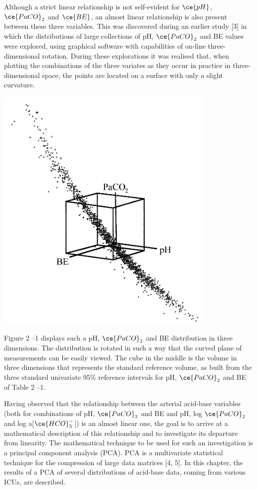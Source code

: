 \documentclass[
  12pt,
  a4paperpaper,
]{report}
\begin{document}
Although a strict linear relationship is not self-evident for
\(\ce{pH}\), \(\ce{PaCO}_{2}\) and \(\ce{BE}\), an almost linear
relationship is also present between these three variables. This was
discovered during an earlier study {[}3{]} in which the distributions of
large collections of pH, \(\ce{PaCO}_{2}\) and BE values were explored,
using graphical software with capabilities of on-line three-dimensional
rotation. During these explorations it was realised that, when plotting
the combinations of the three variates as they occur in practice in
three-dimensional space, the points are located on a surface with only a
slight curvature.

\includegraphics[width=0.8\textwidth,height=\textheight]{figures/H_02_image1.gif}

Figure 2 --1 displays such a pH, \(\ce{PaCO}_{2}\) and BE distribution
in three dimensions. The distribution is rotated in such a way that the
curved plane of measurements can be easily viewed. The cube in the
middle is the volume in three dimensions that represents the standard
reference volume, as built from the three standard univariate 95\%
reference intervals for pH, \(\ce{PaCO}_{2}\) and BE of Table 2 --1.

Having observed that the relationship between the arterial acid-base
variables (both for combinations of pH, \(\ce{PaCO}_{2}\) and BE and pH,
log \(\ce{PaCO}_{2}\) and log a{[}\(\ce{HCO}_{3}^{-}\){]}) is an almost
linear one, the goal is to arrive at a mathematical description of this
relationship and to investigate its departure from linearity. The
mathematical technique to be used for such an investigation is a
principal component analysis (PCA). PCA is a multivariate statistical
technique for the compression of large data matrices {[}4, 5{]}. In this
chapter, the results of a PCA of several distributions of acid-base
data, coming from various ICUs, are described.
\end{document}
